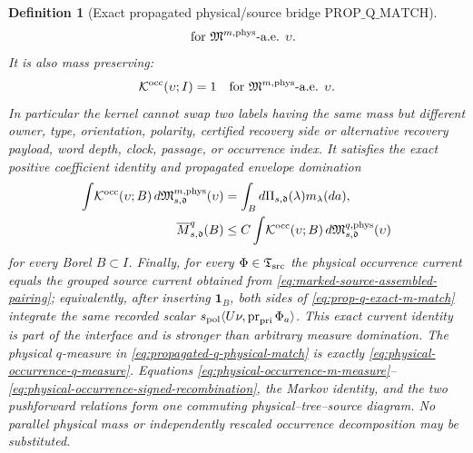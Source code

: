 \documentclass[11pt]{article}
\newtheorem{definition}[theorem]{Definition}
\newcommand{\one}{\mathbf 1}
\begin{document}
\begin{definition}[Exact propagated physical/source bridge
$\mathrm{PROP\_Q\_MATCH}$]
\begin{equation}
 \quad\text{for }\mathfrak M^{m,\rm phys}\text{-a.e. }\upsilon.
\end{equation}
It is also mass preserving:
\begin{equation}
\label{eq:prop-q-occurrence-kernel-markov}
 \mathcal K^{\rm occ}(\upsilon;I)=1
 \quad\text{for }\mathfrak M^{m,\rm phys}\text{-a.e. }\upsilon.
\end{equation}
In particular the kernel cannot swap two labels having the same mass but
different owner, type, orientation, polarity, certified recovery side or
alternative recovery payload, word depth, clock, passage, or occurrence
index.  It satisfies the exact
positive coefficient identity
and propagated envelope domination
\begin{align}
 \int \!\mathcal K^{\rm occ}(\upsilon;B)
       \,d\mathfrak M_{s,\mathfrak d}^{m,\rm phys}(\upsilon)
 &=\int_Bd\Pi_{s,\mathfrak d}(\lambda)m_\lambda(da),
 \label{eq:prop-q-exact-m-match}\\
 \overline M_{s,\mathfrak d}^{q}(B)
 &\le C\int\!\mathcal K^{\rm occ}(\upsilon;B)
       \,d\mathfrak M_{s,\mathfrak d}^{q,\rm phys}(\upsilon)
 \label{eq:propagated-q-physical-match}
\end{align}
for every Borel $B\subset I$.  Finally, for every
$\Phi\in\mathfrak T_{\rm src}$ the physical occurrence current equals the
grouped source current obtained from
\eqref{eq:marked-source-assembled-pairing}; equivalently, after inserting
$\one_B$, both sides of \eqref{eq:prop-q-exact-m-match} integrate the same
recorded scalar
$s_{\rm pol}\langle U\nu,\operatorname{pr}_{\rm pri}\Phi_a\rangle$.  This exact current identity is part
of the interface and is stronger than arbitrary measure domination.
The physical $q$-measure in \eqref{eq:propagated-q-physical-match} is exactly
\eqref{eq:physical-occurrence-q-measure}.  Equations
\eqref{eq:physical-occurrence-m-measure}--
\eqref{eq:physical-occurrence-signed-recombination}, the Markov identity,
and the two pushforward relations form one commuting physical--tree--source
diagram.  No parallel physical mass or independently rescaled occurrence
decomposition may be substituted.
\end{definition}
\end{document}
